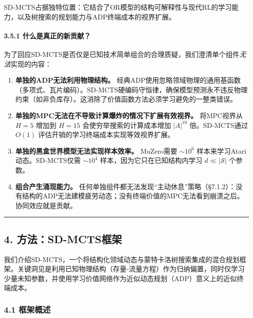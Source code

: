 \documentclass[UTF8]{ctexart}
\let\oldparagraph\paragraph
\renewcommand{\paragraph}[1]{\oldparagraph{#1}\mbox{}}
\begin{document}
SD-MCTS占据独特位置：它结合了OR模型的结构可解释性与现代RL的学习能力，以及树搜索的规划能力与ADP终端成本的视界扩展。

\hypertarget{ux4ec0ux4e48ux662fux771fux6b63ux7684ux65b0ux8d21ux732e}{%
\paragraph{3.5.1
什么是真正的新贡献？}\label{ux4ec0ux4e48ux662fux771fux6b63ux7684ux65b0ux8d21ux732e}}

为了回应SD-MCTS是否仅是已知技术简单组合的合理质疑，我们澄清单个组件\emph{无法}实现的内容：

\begin{enumerate}
\def\labelenumi{\arabic{enumi}.}
\item
  \textbf{单独的ADP无法利用物理结构。}
  经典ADP使用忽略领域物理的通用基函数（多项式、瓦片编码）。SD-MCTS硬编码守恒律，确保模型预测永不违反物理约束（如非负库存）。这消除了价值函数方法必须学习避免的一整类错误。
\item
  \textbf{单独的MPC无法在不导致计算爆炸的情况下扩展有效视界。}
  将MPC视界从 \(H=5\) 增加到 \(H=15\) 会使穷举搜索的计算成本增加
  \(|A|^{10}\) 倍。SD-MCTS通过 \(O(1)\)
  评估开销的学习终端成本实现等效视界扩展。
\item
  \textbf{单独的黑盒世界模型无法实现样本效率。} MuZero需要 \(\sim 10^6\)
  样本来学习Atari动态。SD-MCTS仅需 \(\sim 10^4\)
  样本，因为它只在已知结构内学习 \(d \ll |\mathcal{S}|\) 个参数。
\item
  \textbf{组合产生涌现能力。}
  任何单独组件都无法发现``主动休息''策略（§7.1.2）：没有结构的ADP无法建模疲劳动态；没有终端价值的MPC无法看到崩溃之后。协同效应就是贡献。
\end{enumerate}

\begin{center}\rule{0.5\linewidth}{0.4pt}\end{center}

\hypertarget{ux65b9ux6cd5sd-mctsux6846ux67b6}{%
\subsection{4.
方法：SD-MCTS框架}\label{ux65b9ux6cd5sd-mctsux6846ux67b6}}

我们介绍SD-MCTS，一个将结构化领域动态与蒙特卡洛树搜索集成的混合规划框架。关键洞见是利用已知物理结构（存量-流量方程）作为归纳偏置，同时仅学习少量未知参数，并使用学习价值网络作为近似动态规划（ADP）意义上的近似终端成本。

\hypertarget{ux6846ux67b6ux6982ux8ff0}{%
\subsubsection{4.1 框架概述}\label{ux6846ux67b6ux6982ux8ff0}}
\end{document}
